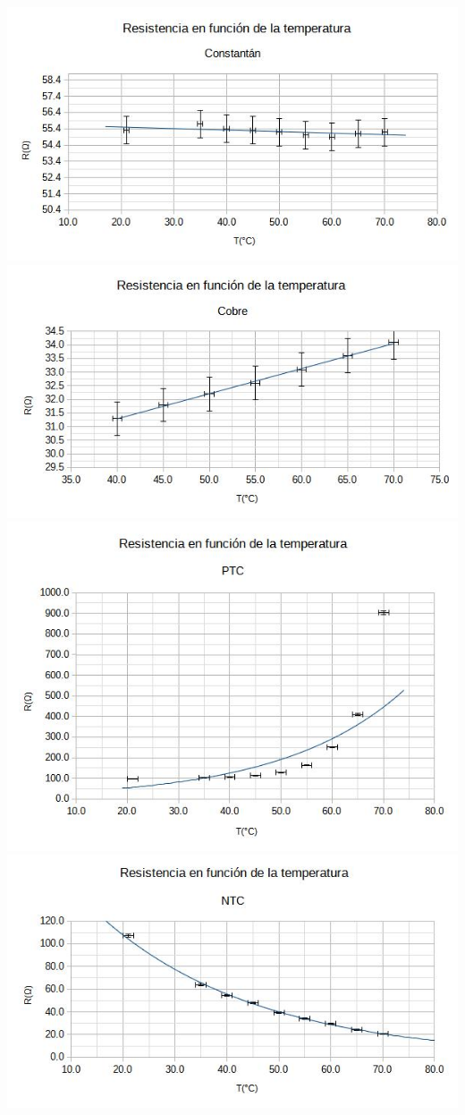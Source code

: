 \documentclass[a4paper,12pt]{article}
\begin{document}
\includegraphics[width=\textwidth]{Exp1_GConst.jpg}
\includegraphics[width=\textwidth]{Exp1_GCobr.jpg}
\includegraphics[width=\textwidth]{Exp1_GPTC.jpg}
\includegraphics[width=\textwidth]{Exp1_GNTC.jpg}
\end{document}
